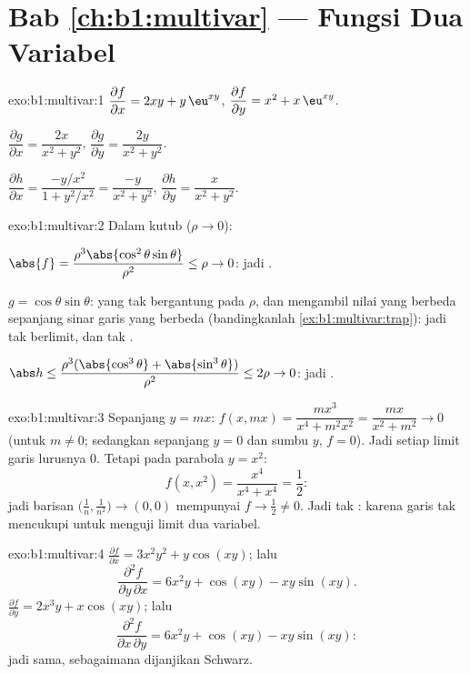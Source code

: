 \section*{Bab \ref{ch:b1:multivar} --- Fungsi Dua Variabel}

\begin{solution}{exo:b1:multivar:1}
$\dfrac{\partial f}{\partial x} = 2xy + y\,\eu^{xy}$,
$\dfrac{\partial f}{\partial y} = x^2 + x\,\eu^{xy}$.

$\dfrac{\partial g}{\partial x} = \dfrac{2x}{x^2+y^2}$,
$\dfrac{\partial g}{\partial y} = \dfrac{2y}{x^2+y^2}$.

$\dfrac{\partial h}{\partial x} = \dfrac{-y/x^2}{1 + y^2/x^2} =
\dfrac{-y}{x^2+y^2}$,
$\dfrac{\partial h}{\partial y} = \dfrac{x}{x^2+y^2}$.
\end{solution}

\begin{solution}{exo:b1:multivar:2}
Dalam  kutub ($\rho \to 0$):

$\abs{f} = \dfrac{\rho^3\abs{\cos^2\theta\sin\theta}}{\rho^2} \leq
\rho \to 0$: jadi .

$g = \cos\theta\sin\theta$: yang tak bergantung pada $\rho$, dan mengambil nilai
yang berbeda sepanjang sinar garis yang berbeda (bandingkanlah
\cref{ex:b1:multivar:trap}): jadi tak berlimit, dan tak .

$\abs h \leq \dfrac{\rho^3(\abs{\cos^3\theta} +
\abs{\sin^3\theta})}{\rho^2} \leq 2\rho \to 0$: jadi .
\end{solution}

\begin{solution}{exo:b1:multivar:3}
Sepanjang $y = mx$: $f(x, mx) = \dfrac{m x^3}{x^4 + m^2 x^2} =
\dfrac{mx}{x^2 + m^2} \to 0$ (untuk $m \neq 0$; sedangkan sepanjang $y = 0$ dan
sumbu $y$, $f = 0$). Jadi setiap limit garis lurusnya $0$. Tetapi pada
parabola $y = x^2$:
\[
f(x, x^2) = \frac{x^4}{x^4 + x^4} = \frac12 :
\]
jadi barisan $\bigl(\frac1n, \frac{1}{n^2}\bigr) \to (0,0)$ mempunyai
$f \to \frac12 \neq 0$. Jadi tak : karena garis tak mencukupi untuk
menguji limit dua variabel.
\end{solution}

\begin{solution}{exo:b1:multivar:4}
$\frac{\partial f}{\partial x} = 3x^2y^2 + y\cos(xy)$; lalu
\[
\frac{\partial^2 f}{\partial y\,\partial x}
= 6x^2 y + \cos(xy) - xy\sin(xy) .
\]
$\frac{\partial f}{\partial y} = 2x^3 y + x\cos(xy)$; lalu
\[
\frac{\partial^2 f}{\partial x\,\partial y}
= 6x^2 y + \cos(xy) - xy\sin(xy) :
\]
jadi sama, sebagaimana dijanjikan Schwarz.
\end{solution}

